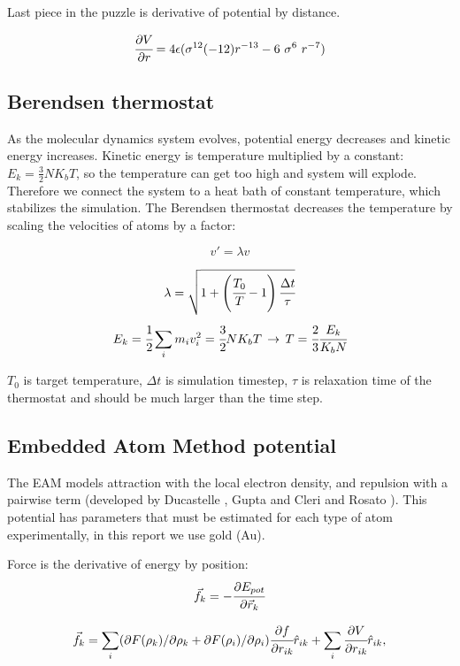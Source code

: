 \documentclass[12pt,a4paper]{article}
\newcommand{\infers}{\,\to\,}
\newcommand{\mat}[1]{\vec{#1}}
\newcommand{\framed}[1]{\tikz[baseline=(char.base)]{\node[shape=rectangle,draw,inner sep=4pt] (char) {#1};}}
\begin{document}
{\centering\framed{ \( \mat{f}_k = - \sum_i \cfrac{\partial V}{\partial r} {\hat r_{ik}} \) }\\}

Last piece in the puzzle is derivative of potential by distance.

\[
\cfrac{\partial V}{\partial r} = 4\epsilon (\sigma^{12} (-12) r^{-13} - 6 \  \sigma^6 \ r^{-7})
\]

\subsection*{Berendsen thermostat}

As the molecular dynamics system evolves, potential energy decreases and kinetic energy increases. Kinetic energy is temperature multiplied by a constant: $E_k = \frac{3}{2} NK_b T$, so the temperature can get too high and system will explode. Therefore we connect the system to a heat bath of constant temperature, which stabilizes the simulation. The Berendsen thermostat \cite{berendsen} decreases the temperature by scaling the velocities of atoms by a factor:

\[ v' = \lambda v \]

\[ \lambda = \sqrt{1 + \left(\cfrac{T_0}{T}-1 \right) \cfrac{\Delta t}{\tau} }  \]
\[ E_k = \cfrac{1}{2} \sum_i m_i v_i^2 = \cfrac{3}{2} N K_b T \infers T = \cfrac{2}{3} \cfrac{E_k}{K_b N} \]

\(T_0\) is target temperature, \(\Delta t \) is simulation timestep, \( \tau \) is relaxation time of the thermostat and should be much larger than the time step.

\subsection*{Embedded Atom Method potential}

The EAM models attraction with the local electron density, and repulsion with a pairwise term (developed by Ducastelle \cite{ducastelle1970modules}, Gupta \cite{gupta} and Cleri and Rosato \cite{CleriRosato}). This potential has parameters that must be estimated for each type of atom experimentally, in this report we use gold (Au).

Force is the derivative of energy by position:
\[
\mat{f}_k = -\cfrac{\partial E_{pot}}{\partial \mat{r}_k}
\]

\[
\mat{f}_k = \sum_i ( \partial F(\rho_k) / \partial \rho_k + \partial F(\rho_i) / \partial \rho_i )  \cfrac{\partial f}{\partial r_{ik}} \hat{r}_{ik} +
\sum_i \cfrac{\partial V}{\partial r_{ik}} \hat{r}_{ik},
\]
\end{document}
